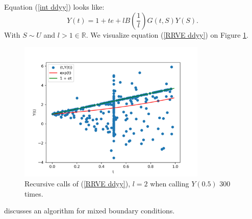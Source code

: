 \documentclass[a4paper,12pt]{article}
\begin{document}
\begin{example}[$y''=y$ mixed boundary conditions]
    Equation (\ref{int ddyy}) looks like:
    \begin{equation} \label{RRVE ddyy}
        Y(t) = 1 + te + l B\left(\frac{1}{l}\right)G(t,S)Y(S).
    \end{equation}
    With $S \sim U$ and $l>1 \in  \mathbb{R}$. We visualize equation (\ref{RRVE ddyy}) on
    Figure \ref{fig:ddyy}.

    \begin{figure}[h!]
        \centering
        \includegraphics[width=0.8\textwidth]{plots/ddyy.png}
        \caption{Recursive calls of (\ref{RRVE ddyy}), $l=2$ when
            calling $Y(0.5)$ $300$ times.}
        \label{fig:ddyy}
    \end{figure}

\end{example}

\begin{related}[$y''=y$ mixed boundary conditions]
    \cite{sawhney_walk_2023} discusses an algorithm for mixed boundary conditions.
\end{related}


%
%
%
\end{document}
